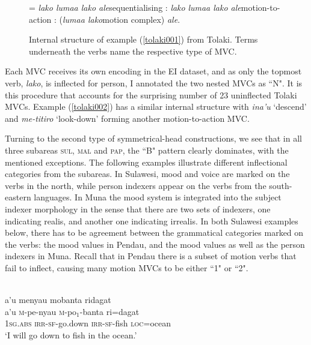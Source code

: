\begin{figure}[h]
\jtree[xunit=8em,yunit=1em]
\! = {\textit{lako lumaa lako ale}}{sequentialising}
: {\textit{lako}} {\textit{lumaa lako ale}}{motion-to-action}
: ({\textit{lumaa lako}}{motion complex}) {\textit{ale}}.
\endjtree
\caption[Internal structure of example (\ref{tolaki001}) from Tolaki]{Internal structure of example (\ref{tolaki001}) from Tolaki. Terms underneath the verbs name the respective type of MVC.}
\label{figure:tolakiMVC}
\end{figure}

Each MVC receives its own encoding in the EI dataset, and as only the topmost verb, \textit{lako}, is inflected for person, I annotated the two nested MVCs as ``N". It is this procedure that accounts for the surprising number of 23 uninflected Tolaki MVCs. Example (\ref{tolaki002}) has a similar internal structure with \textit{ina'u} `descend' and \textit{me-titiro} `look-down' forming another motion-to-action MVC.

Turning to the second type of symmetrical-head constructions, we see that in all three subareas \textsc{sul}, \textsc{mal} and \textsc{pap}, the ``B" pattern clearly dominates, with the mentioned exceptions. The following examples illustrate different inflectional categories from the subareas. In Sulawesi, mood and voice are marked on the verbs in the north, while person indexers appear on the verbs from the south-eastern languages. In Muna the mood system is integrated into the subject indexer morphology in the sense that there are two sets of indexers, one indicating realis, and another one indicating irrealis. In both Sulawesi examples below, there has to be agreement between the grammatical categories marked on the verbs: the mood values in Pendau, and the mood values as well as the person indexers in Muna. Recall that in Pendau there is a subset of motion verbs that fail to inflect, causing many motion MVCs to be either ``1" or ``2".

\ea \label{}
\\
\glll a'u menyau mobanta ridagat \\
a'u \textsc{m}-pe-nyau \textsc{m}-po$_1$-banta ri=dagat \\
1\textsc{sg}.\textsc{abs} \textsc{irr}-\textsc{sf}-go.down \textsc{irr}-\textsc{sf}-fish \textsc{loc}=ocean \\
\glft `I will go down to fish in the ocean.'\\ 
\z

